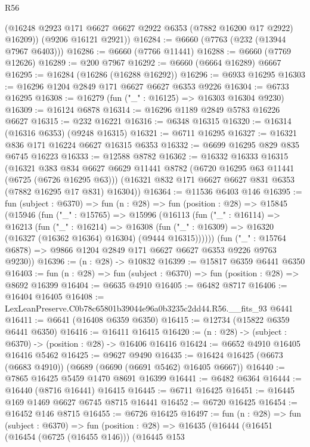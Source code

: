 \begin{lexlean}{R56}
\begin{coremodule}
        (@16248 @2923 @171 @6627 @6627 @2922 @6353 (@7882 @16200 @17 @2922) @16209))
      (@9206 @16121 @2921))
@16284 := @6660 (@7763 (@232 (@13944 @7967 @6403)))
@16286 := @6660 (@7766 @11441)
@16288 := @6660 (@7769 @12626)
@16289 := @200 @7967
@16292 := @6660 (@6664 @16289) @6667
@16295 := @16284 (@16286 (@16288 @16292))
@16296 := @6933 @16295
@16303 := @16296 @1204 @2849 @171 @6627 @6627 @6353 @9226
@16304 := @6733 @16295
@16308 := @16279 (fun ("_" : @16125) => @16303 @16304 @9230)
@16309 := @16124 @6878
@16314 := @16296 @1189 @2849 @5783 @16226 @6627
@16315 := @232 @16221
@16316 := @6348 @16315
@16320 := @16314 (@16316 @6353) (@9248 @16315)
@16321 := @6711 @16295
@16327 := @16321 @836 @171 @16224 @6627 @16315 @6353
@16332 := @6699 @16295 @829 @835 @6745 @16223
@16333 := @12588 @8782
@16362 := @16332
    @16333
    @16315
    (@16321
      @383
      @834
      @6627
      @6629
      @11441
      @8782
      (@6720 @16295 @63 @11441 (@6725 (@6726 @16295 @63)))
      (@16321 @832 @171 @6627 @6627 @831 @6353 (@7882 @16295 @17 @831) @16304))
@16364 := @11536 @6403 @146
@16395 := fun (subject : @6370) =>
  fun (n : @28) =>
  fun (position : @28) =>
  @15845
    (@15946
      (fun ("_" : @15765) =>
      @15996
        (@16113
          (fun ("_" : @16114) =>
          @16213
            (fun ("_" : @16214) =>
            @16308 (fun ("_" : @16309) => @16320 (@16327 (@16362 @16364) @16304) (@9444 @16315))))))
      (fun ("_" : @15764 @6878) => @9866 @1204 @2849 @171 @6627 @6627 @6353 @9226 @9763 @9230))
@16396 := (n : @28) -> @10832
@16399 := @15817 @6359 @6441 @6350
@16403 := fun (n : @28) => fun (subject : @6370) => fun (position : @28) => @8692 @16399
@16404 := @6635 @4910
@16405 := @6482 @8717
@16406 := @16404 @16405
@16408 := LexLeanPreserve.C0b78c65801b39044e96a0b3235c2dd44.R56.__fits_93 @6441
@16411 := @6641 (@16408 @6359 @6350)
@16415 := @12734 (@15822 @6359 @6441 @6350)
@16416 := @16411 @16415
@16420 := (n : @28) -> (subject : @6370) -> (position : @28) -> @16406 @16416
@16424 := @6652 @4910 @16405 @16416 @5462
@16425 := @9627 @9490
@16435 := @16424 @16425 (@6673 (@6683 @4910)) (@6689 (@6690 (@6691 @5462) @16405 @6667))
@16440 := @7865 @16425 @5459 @1470 @8691 @16399
@16441 := @6482 @6364
@16444 := @16440 (@8716 @16441) @16415
@16445 := @6711 @16425
@16451 := @16445 @169 @1469 @6627 @6745 @8715 @16441
@16452 := @6720 @16425
@16454 := @16452 @146 @8715
@16455 := @6726 @16425
@16497 := fun (n : @28) =>
  fun (subject : @6370) =>
  fun (position : @28) =>
  @16435
    (@16444
      (@16451
        (@16454 (@6725 (@16455 @146)))
        (@16445
          @153

\end{coremodule}
\end{lexlean}
